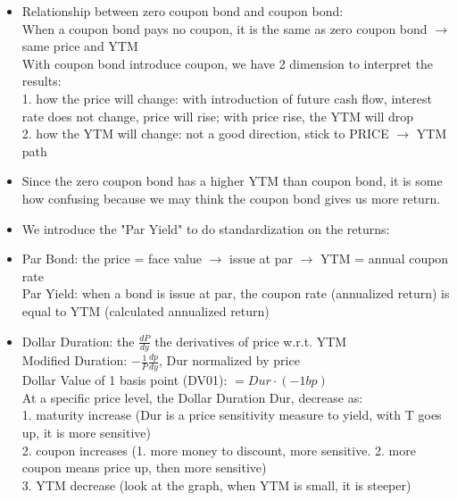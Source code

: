 \documentclass[10pt,landscape]{article}
\begin{document}
\begin{multicols}{2}
\begin{itemize}
			It depends on how we structure the dependent variable and independent variables:\\
			1. Calculate the bond price: the DV is bond price, IDV is the interest rate, negative correlated.\\
			2, Calculate YTM: the DV is YTM, IDV is bond price, if bond price is high, meaning the YTM must be low\\
	\item Relationship between zero coupon bond and coupon bond:\\
			When a coupon bond pays no coupon, it is the same as zero coupon bond $\longrightarrow$ same price and YTM\\
			With coupon bond introduce coupon, we have 2 dimension to interpret the results:\\
			1. how the price will change: with introduction of future cash flow, interest rate does not change, price will rise; with price rise, the YTM will drop\\
			2. how the YTM will change: not a good direction, stick to PRICE $\longrightarrow$ YTM path
	\item Since the zero coupon bond has a higher YTM than coupon bond, it is some how confusing because we may think the coupon bond gives us more return.
	\item We introduce the "Par Yield" to do standardization on the returns:\\
	\item	Par Bond: the price = face value $\longrightarrow$ issue at par $\longrightarrow$ YTM = annual coupon rate\\
		Par Yield: when a bond is issue at par, the coupon rate (annualized return) is equal to YTM (calculated annualized return)
	\item Dollar Duration: the $\frac{dP}{dy}$ the derivatives of price w.r.t. YTM\\
			Modified Duration: $-\frac{1}{P} \frac{dp}{dy}$, Dur normalized by price\\
			Dollar Value of 1 basis point (DV01): $ = Dur \cdot (-1 bp)$\\
			
			At a specific price level, the Dollar Duration Dur, decrease as:\\
			1. maturity increase (Dur is a price sensitivity measure to yield, with T goes up, it is more sensitive)\\
			2. coupon increases (1. more money to discount, more sensitive. 2. more coupon means price up, then more sensitive)\\
			3. YTM decrease (look at the graph, when YTM is small, it is steeper)\\
	

\end{itemize}
\end{multicols}
\end{document}

